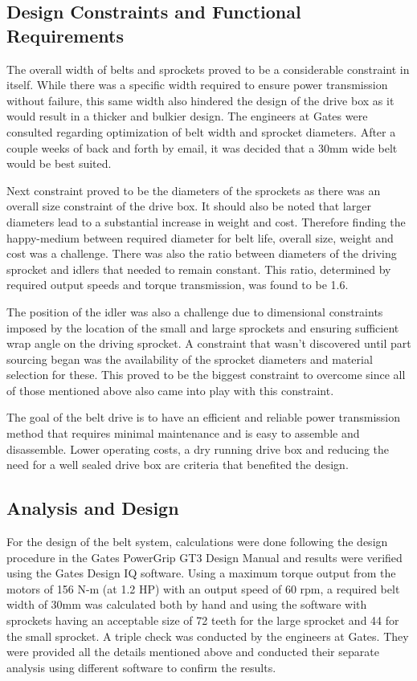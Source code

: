 \subsection{Design Constraints and Functional Requirements}
The overall width of belts and sprockets proved to be a considerable constraint in itself. While there was a specific width required to ensure power transmission without failure, this same width also hindered the design of the drive box as it would result in a thicker and bulkier design. The engineers at Gates were consulted regarding optimization of belt width and sprocket diameters. After a couple weeks of back and forth by email, it was decided that a 30mm wide belt would be best suited.

Next constraint proved to be the diameters of the sprockets as there was an overall size constraint of the drive box. It should also be noted that larger diameters lead to a substantial increase in weight and cost. Therefore finding the happy-medium between required diameter for belt life, overall size, weight and cost was a challenge. There was also the ratio between diameters of the driving sprocket and idlers that needed to remain constant. This ratio, determined by required output speeds and torque transmission, was found to be 1.6.

The position of the idler was also a challenge due to dimensional constraints imposed by the location of the small and large sprockets and ensuring sufficient wrap angle on the driving sprocket. A constraint that wasn’t discovered until part sourcing began was the availability of the sprocket diameters and material selection for these. This proved to be the biggest constraint to overcome since all of those mentioned above also came into play with this constraint.

The goal of the belt drive is to have an efficient and reliable power transmission method that requires minimal maintenance and is easy to assemble and disassemble. Lower operating costs, a dry running drive box and reducing the need for a well sealed drive box are criteria that benefited the design.

\subsection{Analysis and Design}
For the design of the belt system, calculations were done following the design procedure in the Gates PowerGrip GT3 Design Manual and results were verified using the Gates Design IQ software. Using a maximum torque output from the motors of 156 N-m (at 1.2 HP) with an output speed of 60 rpm, a required belt width of 30mm was calculated both by hand and using the software with sprockets having an acceptable size of 72 teeth for the large sprocket and 44 for the small sprocket. A triple check was conducted by the engineers at Gates. They were provided all the details mentioned above and conducted their separate analysis using different software to confirm the results. 

